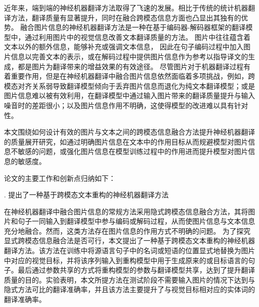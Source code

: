 近年来，端到端的神经机器翻译方法取得了飞速的发展。相比于传统的统计机器翻译方法，翻译质量有显著提升，同时在融合跨模态信息方面也凸显出其独有的优势。
融合图片信息的神经机器翻译方法是一种在基于编码器-解码器框架的翻译模型中，通过利用图片中的视觉信息改善文本翻译质量的方法。
图片中往往蕴含着文本以外的额外信息，能够补充或强调文本信息，%
因此在句子编码过程中加入图片信息以完善文本的表示，或在解码过程中提供图片信息作为参考以指导译文的生成，都是图片为翻译带来的增益效果的有效途径。
尽管图片对于机器翻译过程有着重要作用，但是在神经机器翻译中融合图片信息依然面临着多项挑战，例如，跨模态对齐关系弱导致翻译模型倾向于丢弃图片信息而退化为纯文本翻译模型；或是图片信息难以被有效利用，在翻译模型中通过输入图片带来的翻译质量提升与输入噪音时的差距很小；以及图片信息作用不明确，这使得模型的改进难以具有针对性。

本文围绕如何设计有效的图片与文本之间的跨模态信息融合方法提升神经机器翻译的质量展开研究，如通过明确图片信息在文本中的作用目标从而规避模型对图片信息不敏感的问题，或强化图片信息在模型训练过程中的作用进而提升模型对图片信息的敏感度。

论文的主要工作和创新点归纳如下：

{. 提出了一种基于跨模态文本重构的神经机器翻译方法}

在神经机器翻译中融合图片信息的常规方法采用隐式跨模态信息融合方法，其将图片和句子一同输入到翻译模型中参与编码或解码过程，从而使图片信息与文本信息充分地融合。然而，这类方法存在图片信息的作用方式不明确的问题。%
为了探究显式跨模态信息融合法是否可行，本文提出了一种基于跨模态文本重构的神经机器翻译方法。该方法在训练中将源语言句子中的名词或短语的位置显式地替换为图片中对应的视觉目标，并将该序列输入到重构模型中用于生成原来的或目标语言的句子。最后通过参数共享的方式将重构模型的参数与翻译模型共享，达到了提升翻译质量的目的。实验表明，本文所提方法在测试阶段不需要输入图片的情况下达到与隐式方法可比的翻译准确率，并且该方法主要提升了与视觉目标相对应的实体词的翻译准确率。

